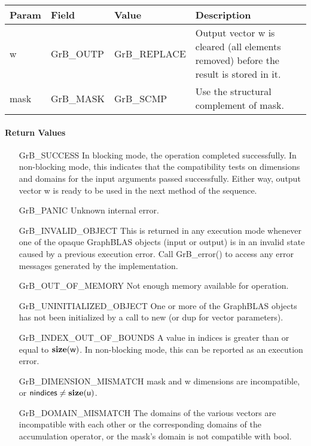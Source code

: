 \begin{itemize}[leftmargin=1in]
    \begin{tabular}{lllp{2.5in}}
        Param & Field  & Value & Description \\
        \hline
        {\sf w}    & {\sf GrB\_OUTP} & {\sf GrB\_REPLACE} & Output vector {\sf w}
        is cleared (all elements removed) before the result is stored in it. \\
        
        {\sf mask} & {\sf GrB\_MASK} & {\sf GrB\_SCMP}   & Use the structural 
        complement of {\sf mask}. \\
    \end{tabular}
\end{itemize}

\paragraph{Return Values}

\begin{itemize}[leftmargin=2.1in]
    \item[{\sf GrB\_SUCCESS}]         In blocking mode, the operation completed
    successfully. In non-blocking mode, this indicates that the compatibility 
    tests on dimensions and domains for the input arguments passed successfully. 
    Either way, output vector {\sf w} is ready to be used in the next method of 
    the sequence.

    \item[{\sf GrB\_PANIC}]            Unknown internal error.
    
    \item[{\sf GrB\_INVALID\_OBJECT}] This is returned in any execution mode 
    whenever one of the opaque GraphBLAS objects (input or output) is in an invalid 
    state caused by a previous execution error.  Call {GrB\_error()} to access 
    any error messages generated by the implementation.

    \item[{\sf GrB\_OUT\_OF\_MEMORY}]  Not enough memory available for operation.
    
    \item[{\sf GrB\_UNINITIALIZED\_OBJECT}] One or more of the GraphBLAS objects
    has not been initialized by a call to {\sf new} (or {\sf dup} for vector
    parameters).

    \item[{\sf GrB\_INDEX\_OUT\_OF\_BOUNDS}]  A value in {\sf indices} is greater
    than or equal to $\bold{size}({\sf w})$.  In non-blocking mode, this can be
    reported as an execution error.
    
    \item[{\sf GrB\_DIMENSION\_MISMATCH}] {\sf mask} and {\sf w} dimensions are
    incompatible, or ${\sf nindices} \neq \bold{size}({\sf u})$. 
    
    \item[{\sf GrB\_DOMAIN\_MISMATCH}]    The domains of the various vectors are
	incompatible with each other or the corresponding domains of the
    accumulation operator, or the mask's domain is not compatible with bool.
\end{itemize}

